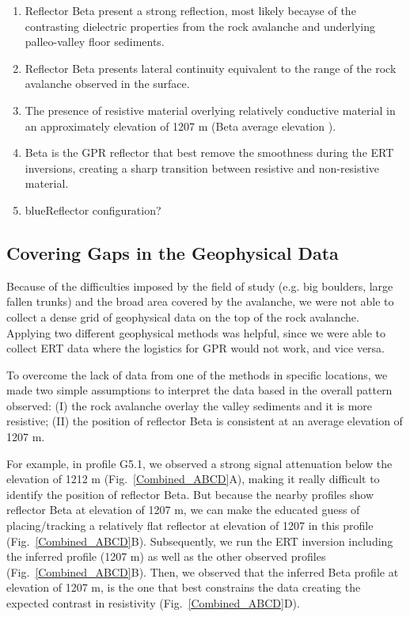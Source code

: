 \documentclass[5p]{elsarticle}
\newcommand{\COMON}{\begin{color}{blue}}
\newcommand{\COMOFF}{\end{color}}
\begin{document}
\begin{enumerate}[I]
\item Reflector Beta present a strong reflection, most likely becayse of the contrasting dielectric properties from the rock avalanche and underlying palleo-valley floor sediments. 
\item Reflector Beta presents lateral continuity equivalent to the range of the rock avalanche observed in the surface.  
\item The presence of resistive material overlying relatively conductive material in an approximately elevation of 1207 m (Beta average elevation ). 
\item Beta is the GPR reflector that best remove the smoothness during the ERT inversions, creating a sharp transition between resistive and non-resistive material.
\item  \COMON Reflector configuration? \COMOFF 
\end{enumerate}



\subsection{Covering Gaps in the Geophysical Data}

Because of the difficulties imposed by the field of study (e.g. big boulders,  large fallen trunks) and the broad area covered by the avalanche, we were not able to collect a dense grid of geophysical data on the top of the rock avalanche. Applying two different geophysical methods was helpful, since we were able to collect ERT data where the logistics for GPR would not work, and vice versa. 

To overcome the lack of data from one of the methods in specific locations, we made two simple assumptions to interpret the data based in the overall pattern observed: (I) the rock avalanche overlay the valley sediments and it is more resistive; (II) the position of reflector Beta is consistent at an average elevation of 1207 m.  

For example, in profile G5.1, we observed a strong signal attenuation below the elevation of 1212 m (Fig.~\ref{Combined_ABCD}A), making it really difficult to identify the position of reflector Beta. But because the nearby profiles show reflector Beta at elevation of 1207 m, we can make the educated guess of placing/tracking a relatively flat reflector at elevation of 1207 in this profile (Fig.~\ref{Combined_ABCD}B). Subsequently, we run the ERT inversion including the inferred profile (1207 m) as well as the other observed profiles (Fig.~\ref{Combined_ABCD}B). Then, we observed that the inferred Beta profile at elevation of 1207 m, is the one that best constrains the data creating the expected contrast in resistivity (Fig.~\ref{Combined_ABCD}D).  
\end{document}
